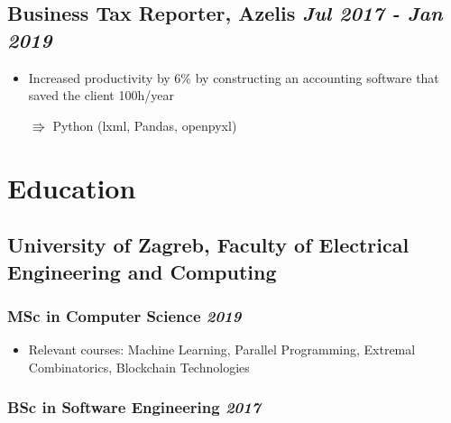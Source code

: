 \documentclass[a4paper]{article}
\newcommand{\bolditalicpair}
[2]
{\textbf{#1} \texorpdfstring{\hfill}{} \textit{#2}}
\begin{document}
\subsection{\bolditalicpair{Business Tax Reporter, Azelis}{Jul 2017 - Jan 2019}}

\begin{itemize}
  \item Increased productivity by 6\% by constructing an accounting software that saved the client 100h/year
  \item[$\Rrightarrow$] Python (lxml, Pandas, openpyxl)
\end{itemize}





\section{Education}
\subsection{\bolditalicpair{University of Zagreb, Faculty of Electrical Engineering and Computing}{}}

\subsubsection{\bolditalicpair{MSc in Computer Science}{2019}}

\begin{itemize}
  \item Relevant courses: Machine Learning, Parallel Programming, Extremal Combinatorics, Blockchain Technologies %
\end{itemize}

\subsubsection{\bolditalicpair{BSc in Software Engineering}{2017}}
\end{document}
